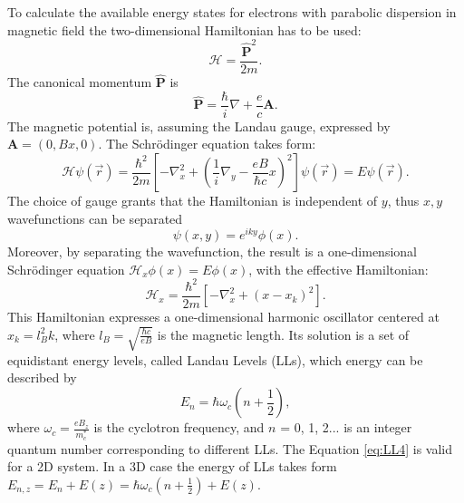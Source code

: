 \documentclass[titlepage,a4paper]{book}
\begin{document}
To calculate the available energy states for electrons with parabolic dispersion in magnetic field the two-dimensional Hamiltonian has to be used:
\begin{equation}
\label{eq:LL0}
\mathcal{H} = \frac{\hat{\mathbf{P}}^2}{2m}.  
\end{equation}
The canonical momentum $\mathbf{\hat{P}}$ is 
\begin{equation}
\label{eq:LL1}
\hat{\mathbf{P}} = \frac{\hbar}{i}\nabla + \frac{e}{c}\mathbf{A}.  
\end{equation}
The magnetic potential is, assuming the Landau gauge, expressed by $\mathbf{A} = (0, Bx, 0)$. The Schrödinger equation takes form:
\begin{equation}
\label{eq:LL2}
\mathcal{H}\psi(\vec{r}) = \frac{\hbar^2}{2m} \left[ -\nabla_x^2 + \left( \frac{1}{i}\nabla_y - \frac{eB}{\hbar c}x \right)^2 \right] \psi(\vec{r}) = E\psi(\vec{r}).
\end{equation}
The choice of gauge grants that the Hamiltonian is independent of $y$, thus $x, y$ wavefunctions can be separated
\begin{equation}
\label{eq:LL2.5}
\psi (x,y) = e^{iky}\phi (x). 
\end{equation}
Moreover, by separating the wavefunction, the result is a one-dimensional Schrödinger equation $\mathcal{H}_x \phi(x) = E \phi(x)$, with the effective Hamiltonian:
\begin{equation}
\label{eq:LL3}
\mathcal{H}_x = \frac{\hbar^2}{2m} \left[ -\nabla_x^2 +(x-x_k)^2 \right].
\end{equation}
This Hamiltonian expresses a one-dimensional harmonic oscillator centered at $x_k = l_B^2 k$, where $l_B = \sqrt{\frac{\hbar c}{eB}}$ is the magnetic length. Its solution is a set of equidistant energy levels, called Landau Levels (LLs), which energy can be described by
\begin{equation}
\label{eq:LL4}
E_n = \hbar\omega_c\left( n+\frac{1}{2} \right),
\end{equation}
where $\omega_c = \frac{eB_z}{m_c^*}$ is the cyclotron frequency, and $n$ = 0, 1, 2... is an integer quantum number corresponding to different LLs. The Equation \ref{eq:LL4} is valid for a 2D system. In a 3D case the energy of LLs takes form $E_{n,z} = E_n + E(z) = \hbar\omega_c\left( n+\frac{1}{2} \right)+ E(z)$.
\end{document}
